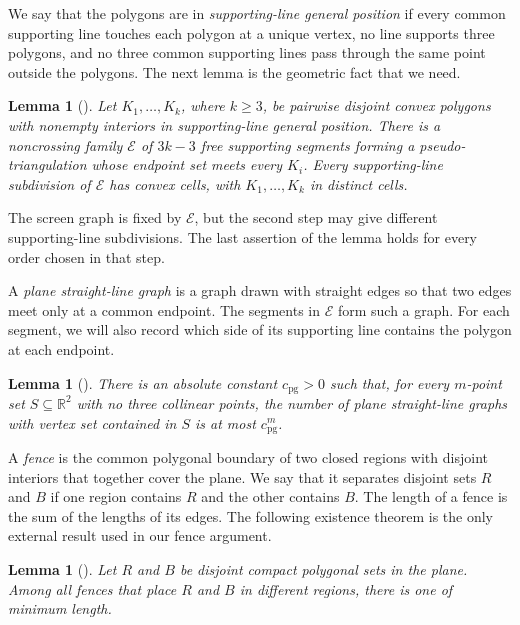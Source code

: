 \documentclass[11pt]{article}
\newtheorem{lemma}[theorem]{Lemma}
\theoremstyle{definition}
\newcommand{\R}{\mathbb{R}}
\begin{document}
We say that the polygons are in \emph{supporting-line general position} if every common supporting line touches each polygon at a unique vertex, no line supports three polygons, and no three common supporting lines pass through the same point outside the polygons. The next lemma is the geometric fact that we need.

\begin{lemma}[\cite{PocchiolaVegter1999,RoteSantosStreinu2008}]\label{lem:supporting-subdivision}
Let \(K_{1},\ldots,K_{k}\), where \(k\ge3\), be pairwise disjoint convex polygons with nonempty interiors in supporting-line general position. There is a noncrossing family \(\mathcal{E}\) of \(3k-3\) free supporting segments forming a pseudo-triangulation whose endpoint set meets every \(K_i\). Every supporting-line subdivision of \(\mathcal{E}\) has convex cells, with \(K_{1},\ldots,K_{k}\) in distinct cells.
\end{lemma}

The screen graph is fixed by \(\mathcal{E}\), but the second step may give different supporting-line subdivisions. The last assertion of the lemma holds for every order chosen in that step.

A \emph{plane straight-line graph} is a graph drawn with straight edges so that two edges meet only at a common endpoint. The segments in \(\mathcal{E}\) form such a graph. For each segment, we will also record which side of its supporting line contains the polygon at each endpoint.

\begin{lemma}[\cite{RoteSantosStreinu2008}]\label{lem:plane-graph-count}
There is an absolute constant \(c_{\mathrm{pg}}>0\) such that, for every \(m\)-point set \(S\subseteq\R^{2}\) with no three collinear points, the number of plane straight-line graphs with vertex set contained in \(S\) is at most \(c_{\mathrm{pg}}^{m}\).
\end{lemma}


A \emph{fence} is the common polygonal boundary of two closed regions with disjoint interiors that together cover the plane. We say that it separates disjoint sets \(R\) and \(B\) if one region contains \(R\) and the other contains \(B\). The length of a fence is the sum of the lengths of its edges. The following existence theorem is the only external result used in our fence argument.

\begin{lemma}[\cite{AbrahamsenGiannopoulosLofflerRote2020}]\label{lem:shortest-fence}
Let \(R\) and \(B\) be disjoint compact polygonal sets in the plane. Among all fences that place \(R\) and \(B\) in different regions, there is one of minimum length.
\end{lemma}
\end{document}
